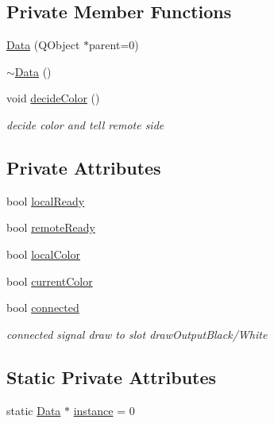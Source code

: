 \subsection*{Private Member Functions}
\begin{DoxyCompactItemize}
\item 
\hyperlink{classData_a1eaf44e85889a39a1263db2172162530}{Data} (Q\+Object $\ast$parent=0)
\item 
\hyperlink{classData_aab31956423290f0d62dcca47ab4d16dd}{$\sim$\+Data} ()
\item 
void \hyperlink{classData_ae73f56bd8100715a1c2fa0765f5bfd25}{decide\+Color} ()
\begin{DoxyCompactList}\small\item\em decide color and tell remote side \end{DoxyCompactList}\end{DoxyCompactItemize}
\subsection*{Private Attributes}
\begin{DoxyCompactItemize}
\item 
bool \hyperlink{classData_aba43b573b14a94fa8798b76e92aa2db2}{local\+Ready}
\item 
bool \hyperlink{classData_a611e221f2d956e25eee03fc88d2bd453}{remote\+Ready}
\item 
bool \hyperlink{classData_a5530c3c349903bb4f6b3c95223de40ad}{local\+Color}
\item 
bool \hyperlink{classData_a78b5ab819236924f1699f83f0eafc0d2}{current\+Color}
\item 
bool \hyperlink{classData_adc0eab5a1c090fa044827e957c5d06f9}{connected}
\begin{DoxyCompactList}\small\item\em connected signal draw to slot draw\+Output\+Black/\+White \end{DoxyCompactList}\end{DoxyCompactItemize}
\subsection*{Static Private Attributes}
\begin{DoxyCompactItemize}
\item 
static \hyperlink{classData}{Data} $\ast$ \hyperlink{classData_ad373f0e9d46abaf2e67a6c40d4510d29}{instance} = 0
\end{DoxyCompactItemize}


